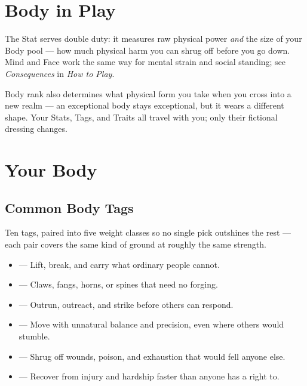 \section{Body in Play}

The  Stat serves double duty: it measures raw physical
power \emph{and} the size of your Body pool --- how much physical harm
you can shrug off before you go down. Mind and Face work the same way
for mental strain and social standing; see \emph{Consequences} in
\emph{How to Play}.

Body rank also determines what physical form you take when you cross
into a new realm --- an exceptional body stays exceptional, but it wears
a different shape. Your Stats, Tags, and Traits all travel with you; only
their fictional dressing changes.

\section{Your Body}

\subsection*{Common Body Tags}
Ten tags, paired into five weight classes so no single pick outshines the
rest --- each pair covers the same kind of ground at roughly the same
strength.

\begin{itemize}
  \item {} --- Lift, break, and carry what ordinary people cannot.
  \item {} --- Claws, fangs, horns, or spines that need no forging.
\end{itemize}

\begin{itemize}
  \item {} --- Outrun, outreact, and strike before others can respond.
  \item {} --- Move with unnatural balance and precision, even where others would stumble.
\end{itemize}

\begin{itemize}
  \item {} --- Shrug off wounds, poison, and exhaustion that would fell anyone else.
  \item {} --- Recover from injury and hardship faster than anyone has a right to.
\end{itemize}

